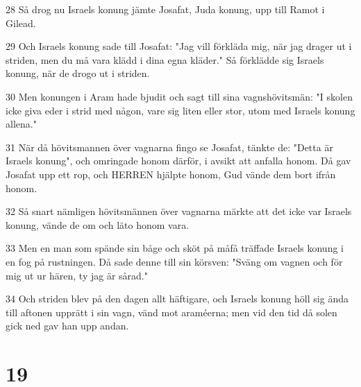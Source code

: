 \par 28 Så drog nu Israels konung jämte Josafat, Juda konung, upp till Ramot i Gilead.
\par 29 Och Israels konung sade till Josafat: "Jag vill förkläda mig, när jag drager ut i striden, men du må vara klädd i dina egna kläder." Så förklädde sig Israels konung, när de drogo ut i striden.
\par 30 Men konungen i Aram hade bjudit och sagt till sina vagnshövitsmän: "I skolen icke giva eder i strid med någon, vare sig liten eller stor, utom med Israels konung allena."
\par 31 När då hövitsmannen över vagnarna fingo se Josafat, tänkte de: "Detta är Israels konung", och omringade honom därför, i avsikt att anfalla honom. Då gav Josafat upp ett rop, och HERREN hjälpte honom, Gud vände dem bort ifrån honom.
\par 32 Så snart nämligen hövitsmännen över vagnarna märkte att det icke var Israels konung, vände de om och läto honom vara.
\par 33 Men en man som spände sin båge och sköt på måfå träffade Israels konung i en fog på rustningen. Då sade denne till sin körsven: "Sväng om vagnen och för mig ut ur hären, ty jag är sårad."
\par 34 Och striden blev på den dagen allt häftigare, och Israels konung höll sig ända till aftonen upprätt i sin vagn, vänd mot araméerna; men vid den tid då solen gick ned gav han upp andan.

\chapter{19}

